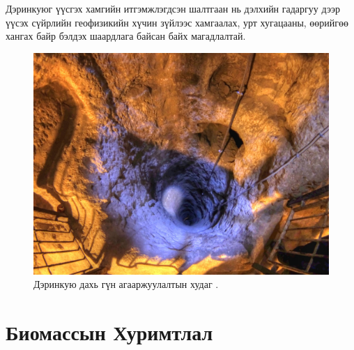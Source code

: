 \documentclass[10pt,twocolumn,letterpaper]{article}
\begin{document}
Дэринкуюг үүсгэх хамгийн итгэмжлэгдсэн шалтгаан нь дэлхийн гадаргуу дээр үүсэх сүйрлийн геофизикийн хүчин зүйлээс хамгаалах, урт хугацааны, өөрийгөө хангах байр бэлдэх шаардлага байсан байх магадлалтай.

\begin{figure}[t]
\begin{center}
   \includegraphics[width=1\linewidth]{derinkuyu-air.jpg}
\end{center}
   \caption{Дэринкую дахь гүн агааржуулалтын худаг \cite{53}.}
\label{fig:6}
\label{fig:onecol}
\end{figure}



\section{Биомассын Хуримтлал}
\end{document}
